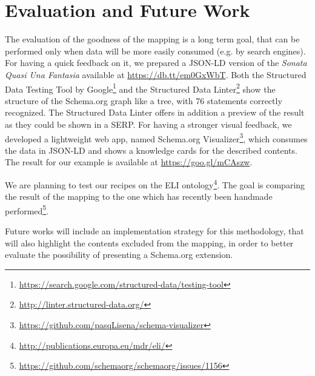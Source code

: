\documentclass{llncs}
\begin{document}

\section{Evaluation and Future Work}
\label{sec:evaluation}

The evaluation of the goodness of the mapping is a long term goal, that can be performed only when data will be more easily consumed (e.g. by search engines). For having a quick feedback on it, we prepared a JSON-LD version of the \textit{Sonata Quasi Una Fantasia} available at \url{https://db.tt/em0GxWbT}.
Both the Structured Data Testing Tool by Google\footnote{\url{https://search.google.com/structured-data/testing-tool}} and the Structured Data Linter\footnote{\url{http://linter.structured-data.org/}} show the structure of the Schema.org graph like a tree, with 76 statements correctly recognized. The Structured Data Linter offers in addition a preview of the result as they could be shown in a SERP.
For having a stronger visual feedback, we developed a lightweight web app, named Schema.org Visualizer\footnote{\url{https://github.com/pasqLisena/schema-visualizer}}, which consumes the data in JSON-LD and shows a knowledge cards for the described contents. The result for our example is available at \url{https://goo.gl/mCAszw}.

We are planning to test our recipes on the ELI ontology\footnote{\url{http://publications.europa.eu/mdr/eli/}}. The goal is comparing the result of the mapping to the one which has recently been handmade performed\footnote{\url{https://github.com/schemaorg/schemaorg/issues/1156}}.

Future works will include an implementation strategy for this methodology, that will also highlight the contents excluded from the mapping, in order to better evaluate the possibility of presenting a Schema.org extension.



\end{document}
